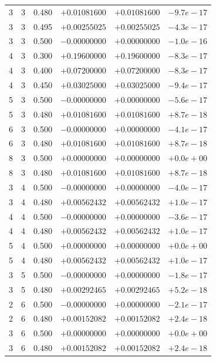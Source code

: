 \begin{table}[h]
{\begin{tabular}{rrrrrr}
3 & 3 & 0.480 & $+0.01081600$ & $+0.01081600$ & $-9.7e-17$ \\
3 & 3 & 0.495 & $+0.00255025$ & $+0.00255025$ & $-4.3e-17$ \\
3 & 3 & 0.500 & $-0.00000000$ & $+0.00000000$ & $-1.0e-16$ \\
4 & 3 & 0.300 & $+0.19600000$ & $+0.19600000$ & $-8.3e-17$ \\
4 & 3 & 0.400 & $+0.07200000$ & $+0.07200000$ & $-8.3e-17$ \\
4 & 3 & 0.450 & $+0.03025000$ & $+0.03025000$ & $-9.4e-17$ \\
5 & 3 & 0.500 & $-0.00000000$ & $+0.00000000$ & $-5.6e-17$ \\
5 & 3 & 0.480 & $+0.01081600$ & $+0.01081600$ & $+8.7e-18$ \\
6 & 3 & 0.500 & $-0.00000000$ & $+0.00000000$ & $-4.1e-17$ \\
6 & 3 & 0.480 & $+0.01081600$ & $+0.01081600$ & $+8.7e-18$ \\
8 & 3 & 0.500 & $+0.00000000$ & $+0.00000000$ & $+0.0e+00$ \\
8 & 3 & 0.480 & $+0.01081600$ & $+0.01081600$ & $+8.7e-18$ \\
3 & 4 & 0.500 & $-0.00000000$ & $+0.00000000$ & $-4.0e-17$ \\
3 & 4 & 0.480 & $+0.00562432$ & $+0.00562432$ & $+1.0e-17$ \\
4 & 4 & 0.500 & $-0.00000000$ & $+0.00000000$ & $-3.6e-17$ \\
4 & 4 & 0.480 & $+0.00562432$ & $+0.00562432$ & $+1.0e-17$ \\
5 & 4 & 0.500 & $+0.00000000$ & $+0.00000000$ & $+0.0e+00$ \\
5 & 4 & 0.480 & $+0.00562432$ & $+0.00562432$ & $+1.0e-17$ \\
3 & 5 & 0.500 & $-0.00000000$ & $+0.00000000$ & $-1.8e-17$ \\
3 & 5 & 0.480 & $+0.00292465$ & $+0.00292465$ & $+5.2e-18$ \\
2 & 6 & 0.500 & $-0.00000000$ & $+0.00000000$ & $-2.1e-17$ \\
2 & 6 & 0.480 & $+0.00152082$ & $+0.00152082$ & $+2.4e-18$ \\
3 & 6 & 0.500 & $+0.00000000$ & $+0.00000000$ & $+0.0e+00$ \\
3 & 6 & 0.480 & $+0.00152082$ & $+0.00152082$ & $+2.4e-18$ \\
\bottomrule\end{tabular}}
\end{table}

